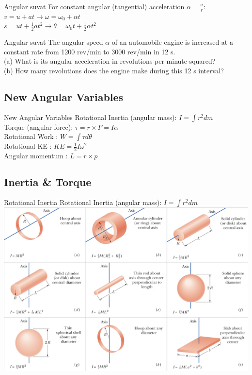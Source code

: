 \begin{frame}{Angular suvat}
\small
For constant angular (tangential) acceleration $\alpha =\frac{a}{r}$:\\[2ex]
$v = u + at \rightarrow \omega = \omega_0 + \alpha t $\\[2ex]
$s = ut + \frac{1}{2}at^2 \rightarrow \theta = \omega_0 t + \frac{1}{2}\alpha t^2 $\\[2ex]
\end{frame}

\begin{frame}{Angular suvat}
\small
The angular speed $\alpha$ of an automobile engine is increased at a constant rate from 1200 rev/min to 3000 rev/min in 12 s.\\[1ex]
 (a) What is its angular acceleration in revolutions per minute-squared?\\[1ex]
 (b) How many revolutions does the engine make during this 12 s interval?\\[1ex]
\end{frame}


 \subsection{ New  Angular Variables}

\begin{frame}{New Angular Variables}
\small
Rotational Inertia (angular mass): $I = \int r^2 dm$\\[1ex]
Torque (angular force): $\tau = r \times F = I\alpha$\\[1ex]
Rotational Work : $W = \int  \tau d\theta$\\[1ex]
Rotational KE : $KE = \frac{1}{2}I\omega^2$\\[1ex]
Angular momentum : $L = r \times p$\\[1ex]
\end{frame}


 \subsection{Inertia \& Torque}
 
 \begin{frame}{Rotational Inertia}
\small
Rotational Inertia (angular mass): $I = \int r^2 dm$\\[1ex]
\includegraphics[scale=0.2]{momsofI}
\end{frame}


